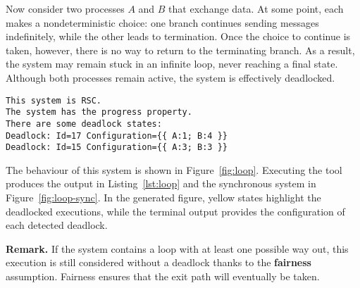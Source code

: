 \begin{example}\label{exm:loop}
Now consider two processes $A$ and $B$ that exchange data. At some
point, each makes a nondeterministic choice: one branch continues
sending messages indefinitely, while the other leads to termination.
Once the choice to continue is taken, however, there is no way to
return to the terminating branch. As a result, the system may remain
stuck in an infinite loop, never reaching a final state. Although both
processes remain active, the system is effectively deadlocked.

\bigskip

\begin{lstlisting}[language={},caption={Output of Example~\ref{exm:loop}.},
    label={lst:loop}]
This system is RSC.
The system has the progress property.
There are some deadlock states:
Deadlock: Id=17 Configuration={{ A:1; B:4 }}
Deadlock: Id=15 Configuration={{ A:3; B:3 }}
\end{lstlisting}

The behaviour of this system is shown in Figure~\ref{fig:loop}. 
Executing the tool produces the output in
Listing~\ref{lst:loop} and the synchronous system in
Figure~\ref{fig:loop-sync}. In the
generated figure, yellow states highlight the deadlocked executions,
while the terminal output provides the configuration of each detected
deadlock.

\textbf{Remark.} 
If the system contains a loop with at least one possible way out, this 
execution is still considered without a deadlock thanks to the 
\textbf{fairness} assumption. 
Fairness ensures that the exit path will eventually be taken.



\end{example}
